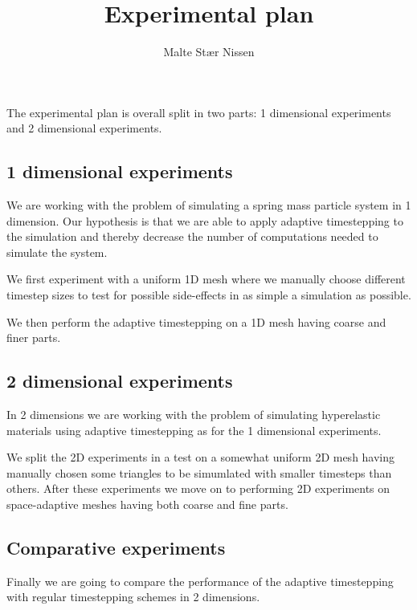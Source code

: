 \documentclass[11pt,a4paper]{article}
\title{Experimental plan}
\author{Malte Stær Nissen}
\begin{document}
\maketitle

The experimental plan is overall split in two parts: 1 dimensional experiments and 2
dimensional experiments.

\subsection{1 dimensional experiments}
We are working with the problem of simulating a spring mass particle system in 1
dimension. Our hypothesis is that we are able to apply adaptive timestepping to
the simulation and thereby decrease the number of computations needed to
simulate the system.

We first experiment with a uniform 1D mesh where we manually choose different
timestep sizes to test for possible side-effects in as simple a simulation as
possible.

We then perform the adaptive timestepping on a 1D mesh having coarse and finer
parts.

\subsection{2 dimensional experiments}

In 2 dimensions we are working with the problem of simulating hyperelastic
materials using adaptive timestepping as for the 1 dimensional experiments.

We split the 2D experiments in a test on a somewhat uniform 2D mesh having
manually chosen some triangles to be simumlated with smaller timesteps than
others. After these experiments we move on to performing 2D experiments on
space-adaptive meshes having both coarse and fine parts.


\subsection{Comparative experiments}

Finally we are going to compare the performance of the adaptive timestepping
with regular timestepping schemes in 2 dimensions.



%
%
%
%
%
%
%
%
%
%
%
\end{document}

